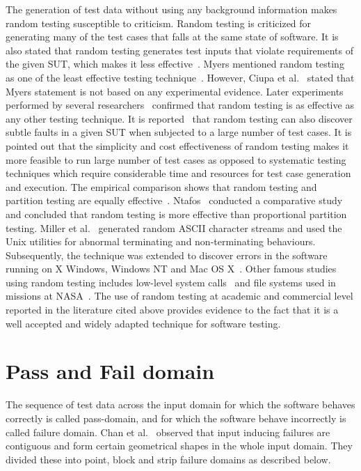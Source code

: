The generation of test data without using any background information makes random testing susceptible to criticism. Random testing is criticized for generating many of the test cases that falls at the same state of software. It is also stated that random testing generates test inputs that violate requirements of the given SUT, which makes it less effective~\cite{pacheco2009directed, sen2007effective}. Myers mentioned random testing as one of the least effective testing technique~\cite{myers2011art}. However, Ciupa et al.~\cite{ciupa2007experimental} stated that Myers statement is not based on any experimental evidence. Later experiments performed by several researchers~\cite{ciupa2008finding, hamlet1994random,  leitner2007efficient} confirmed that random testing is as effective as any other testing technique. It is reported~\cite{duran1981report} that random testing can also discover subtle faults in a given SUT when subjected to a large number of test cases. It is pointed out that the simplicity and cost effectiveness of random testing makes it more feasible to run large number of test cases as opposed to systematic testing techniques which require considerable time and resources for test case generation and execution. The empirical comparison shows that random testing and partition testing are equally effective~\cite{hamlet1990partition}. Ntafos~\cite{ntafos1998random} conducted a comparative study and concluded that random testing is more effective than proportional partition testing. Miller et al.~\cite{miller1990empirical} generated random ASCII character streams and used the Unix utilities for abnormal terminating and non-terminating behaviours. Subsequently, the technique was extended to discover errors in the software running on X Windows, Windows NT and Mac OS X~\cite{forrester2000empirical, miller2006empirical}. Other famous studies using random testing includes low-level system calls~\cite{kropp1998automated} and file systems used in missions at NASA~\cite{groce2007randomized}. The use of random testing at academic and commercial level reported in the literature cited above provides evidence to the fact that it is a well accepted and widely adapted technique for software testing.



\section{Pass and Fail domain} \label{sec:failuredomains_2}
\label{sec:genuineandfailuredomain}
The sequence of test data across the input domain for which the software behaves correctly is called pass-domain, and for which the software behave incorrectly is called failure domain. Chan et al.~\cite{chan1996proportional} observed that input inducing failures are contiguous and form certain geometrical shapes in the whole input domain. They divided these into point, block and strip failure domains as described below.

